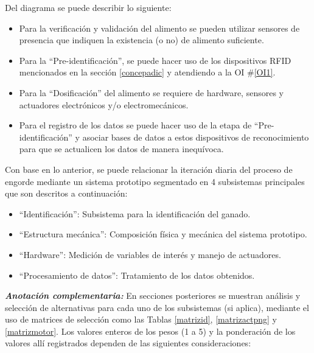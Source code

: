 Del diagrama se puede describir lo siguiente:

\begin{itemize}
	\item Para la verificación y validación del alimento se pueden utilizar sensores de presencia que indiquen la existencia (o no) de alimento suficiente.
	\item Para la ``Pre-identificación'', se puede hacer uso de los dispositivos RFID mencionados en la sección \ref{concepadic} y atendiendo a la OI \#\ref{OI1}. %
	\item Para la ``Dosificación'' del alimento se requiere de hardware, sensores y actuadores electrónicos y/o electromecánicos.
	\item Para el registro de los datos se puede hacer uso de la etapa de ``Pre-identificación'' y asociar bases de datos a estos dispositivos de reconocimiento para que se actualicen los datos de manera inequívoca.
\end{itemize}

Con base en lo anterior, se puede relacionar la iteración diaria del proceso de engorde mediante un sistema prototipo segmentado en 4 subsistemas principales  que son descritos a continuación:

\begin{itemize}
    \item ``Identificación'': Subsistema para la identificación del ganado.
    \item ``Estructura mecánica'': Composición física y mecánica del sistema prototipo.
    \item ``Hardware'': Medición de variables de interés y manejo de actuadores.
    \item ``Procesamiento de datos'': Tratamiento de los datos obtenidos.
\end{itemize}

\textit{\textbf{Anotación complementaria: }} En secciones posteriores se muestran análisis y selección de alternativas para cada uno de los subsistemas (si aplica), mediante el uso de matrices de selección como las Tablas \ref{matrizid}, \ref{matrizactpng} y \ref{matrizmotor}. Los valores enteros de los pesos (1 a 5) y la ponderación de los valores allí registrados dependen de las siguientes consideraciones:

